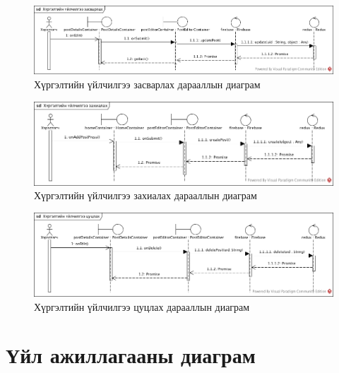 \begin{figure}[H]
	\centering
	\includegraphics[width=\textwidth]{Figures/shinjilgee/seq/hurgeltiin_uilchilgee_zasvarlah.jpg}
  \caption{Хүргэлтийн үйлчилгээ засварлах дарааллын диаграм}
\end{figure}

\begin{figure}[H]
	\centering
	\includegraphics[width=\textwidth]{Figures/shinjilgee/seq/hurgeltiin_uilchilgee_zahialah.jpg}
  \caption{Хүргэлтийн үйлчилгээ захиалах дарааллын диаграм}
\end{figure}

\begin{figure}[H]
	\centering
	\includegraphics[width=\textwidth]{Figures/shinjilgee/seq/hurgeltiin_uilchilgee_tsutslah.jpg}
  \caption{Хүргэлтийн үйлчилгээ цуцлах дарааллын диаграм}
\end{figure}


\section{Үйл ажиллагааны диаграм}

